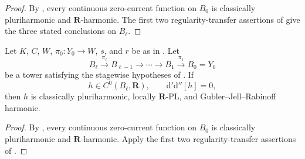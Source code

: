 \begin{proof}
By , every continuous
zero-current function on $B_0$ is classically pluriharmonic and
$\mathbf R$-harmonic.  The first two regularity-transfer assertions of
 give the three stated
conclusions on $B_\ell$.
\end{proof}

\begin{corollary}
\label{cor:p062-mixed-open-polycylinder-bundle-mixed-bundle-towers}
Let $K$, $C$, $W$, $\pi_0:Y_0\to W$, $s$, and $r$ be as in
.  Let
\[
 B_\ell\xrightarrow{\pi_\ell}B_{\ell-1}
 \longrightarrow\cdots\longrightarrow B_1
 \xrightarrow{\pi_1}B_0=Y_0
\]
be a tower satisfying the stagewise hypotheses of
.  If
\[
 h\in C^0(B_\ell,\mathbf R),
 \qquad \mathrm d'\mathrm d''[h]=0,
\]
then $h$ is classically pluriharmonic, locally $\mathbf R$-PL, and
Gubler--Jell--Rabinoff harmonic.
\end{corollary}

\begin{proof}
By , every
continuous zero-current function on $B_0$ is classically pluriharmonic and
$\mathbf R$-harmonic.  Apply the first two regularity-transfer assertions
of .
\end{proof}
